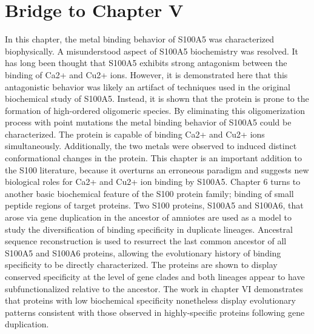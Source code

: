 \section{Bridge to Chapter V}
In this chapter, the metal binding behavior of S100A5 was characterized biophysically. A misunderstood aspect of S100A5 biochemistry was resolved. It has long been thought that S100A5 exhibits strong antagonism between the binding of Ca2+ and Cu2+ ions. However, it is demonstrated here that this antagonistic behavior was likely an artifact of techniques used in the original biochemical study of S100A5. Instead, it is shown that the protein is prone to the formation of high-ordered oligomeric species. By eliminating this oligomerization process with point mutations the metal binding behavior of S100A5 could be characterized. The protein is capable of binding Ca2+ and Cu2+ ions simultaneously. Additionally, the two metals were observed to induced distinct conformational changes in the protein. This chapter is an important addition to the S100 literature, because it overturns an erroneous paradigm and suggests new biological roles for  Ca2+ and Cu2+ ion binding by S100A5. Chapter 6 turns to another basic biochemical feature of the S100 protein family; binding of small peptide regions of target proteins. Two S100 proteins, S100A5 and S100A6, that arose via gene duplication in the ancestor of amniotes are used as a model to study the diversification of binding specificity in duplicate lineages. Ancestral sequence reconstruction is used to resurrect the last common ancestor of all S100A5 and S100A6 proteins, allowing the evolutionary history of binding specificity to be directly characterized. The proteins are shown to display conserved specificity at the level of gene clades and both lineages appear to have subfunctionalized relative to the ancestor. The work in chapter VI demonstrates that proteins with low biochemical specificity nonetheless display evolutionary patterns consistent with those observed in highly-specific proteins following gene duplication. 

